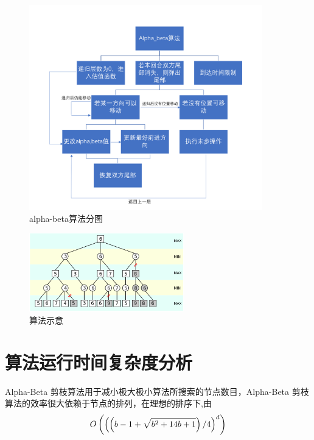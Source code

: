 \documentclass{ctexrep}
\begin{document}
\begin{figure}[H] %
    \centering %
    \includegraphics[width=0.9\textwidth]{2.png} %
    \caption{alpha-beta算法分图} %
    \label{wolf} %
\end{figure}%

\begin{figure}[H] %
    \centering %
    \includegraphics[width=0.6\textwidth]{3.png} %
    \caption{算法示意} %
    \label{wolf} %
\end{figure}%


\section{算法运行时间复杂度分析}
Alpha-Beta 剪枝算法用于减小极大极小算法所搜索的节点数目，Alpha-Beta 剪枝算法的效率很大依赖于节点的排列，在理想的排序下,由
\begin{equation}
\label{eqn:eqn1}
O\left(\left(\left(b-1+\sqrt{b^{2}+14 b+1}\right) / 4\right)^{d}\right)\notag
\end{equation}
\end{document}
